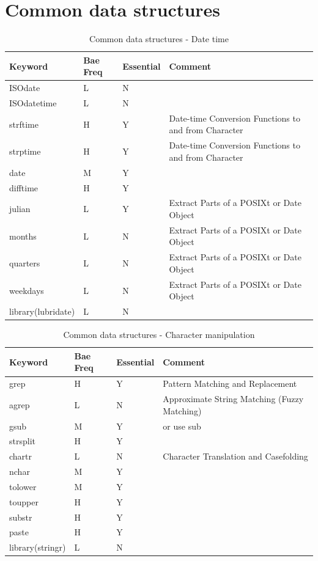\documentclass[11pt,]{krantz}
\theoremstyle{definition}
\theoremstyle{definition}
\theoremstyle{remark}
\begin{document}
\section{Common data structures}\label{common-data-structures}

\begin{table}

\caption{\label{tab:knitchunk12}Common data structures - Date time}
\centering
\begin{tabular}[t]{llll}
\toprule
Keyword & Bae Freq & Essential & Comment\\
\midrule
ISOdate & L & N & \\
ISOdatetime & L & N & \\
strftime & H & Y & Date-time Conversion Functions to and from Character\\
strptime & H & Y & Date-time Conversion Functions to and from Character\\
date & M & Y & \\
\addlinespace
difftime & H & Y & \\
julian & L & Y & Extract Parts of a POSIXt or Date Object\\
months & L & N & Extract Parts of a POSIXt or Date Object\\
quarters & L & N & Extract Parts of a POSIXt or Date Object\\
weekdays & L & N & Extract Parts of a POSIXt or Date Object\\
library(lubridate) & L & N & \\
\bottomrule
\end{tabular}
\end{table}

\begin{table}

\caption{\label{tab:knitchunk13}Common data structures - Character manipulation }
\centering
\begin{tabular}[t]{llll}
\toprule
Keyword & Bae Freq & Essential & Comment\\
\midrule
grep & H & Y & Pattern Matching and Replacement\\
agrep & L & N & Approximate String Matching (Fuzzy Matching)\\
gsub & M & Y & or use sub\\
strsplit & H & Y & \\
chartr & L & N & Character Translation and Casefolding\\
\addlinespace
nchar & M & Y & \\
tolower & M & Y & \\
toupper & H & Y & \\
substr & H & Y & \\
paste & H & Y & \\
library(stringr) & L & N & \\
\bottomrule
\end{tabular}
\end{table}
\end{document}
